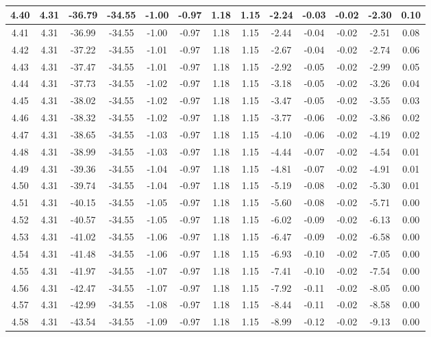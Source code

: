 \begin{table}[htbp]
\begin{adjustbox}{angle=90}
\begin{tabular}{|c|c|c|c|c|c|c|c|c|c|c|c|c|}
 4.40 & 4.31 & -36.79 & -34.55 & -1.00 & -0.97 & 1.18 & 1.15 & -2.24 & -0.03 & -0.02 & -2.30 & 0.10\\ \hline
 4.41 & 4.31 & -36.99 & -34.55 & -1.00 & -0.97 & 1.18 & 1.15 & -2.44 & -0.04 & -0.02 & -2.51 & 0.08\\ \hline
 4.42 & 4.31 & -37.22 & -34.55 & -1.01 & -0.97 & 1.18 & 1.15 & -2.67 & -0.04 & -0.02 & -2.74 & 0.06\\ \hline
 4.43 & 4.31 & -37.47 & -34.55 & -1.01 & -0.97 & 1.18 & 1.15 & -2.92 & -0.05 & -0.02 & -2.99 & 0.05\\ \hline
 4.44 & 4.31 & -37.73 & -34.55 & -1.02 & -0.97 & 1.18 & 1.15 & -3.18 & -0.05 & -0.02 & -3.26 & 0.04\\ \hline
 4.45 & 4.31 & -38.02 & -34.55 & -1.02 & -0.97 & 1.18 & 1.15 & -3.47 & -0.05 & -0.02 & -3.55 & 0.03\\ \hline
 4.46 & 4.31 & -38.32 & -34.55 & -1.02 & -0.97 & 1.18 & 1.15 & -3.77 & -0.06 & -0.02 & -3.86 & 0.02\\ \hline
 4.47 & 4.31 & -38.65 & -34.55 & -1.03 & -0.97 & 1.18 & 1.15 & -4.10 & -0.06 & -0.02 & -4.19 & 0.02\\ \hline
 4.48 & 4.31 & -38.99 & -34.55 & -1.03 & -0.97 & 1.18 & 1.15 & -4.44 & -0.07 & -0.02 & -4.54 & 0.01\\ \hline
 4.49 & 4.31 & -39.36 & -34.55 & -1.04 & -0.97 & 1.18 & 1.15 & -4.81 & -0.07 & -0.02 & -4.91 & 0.01\\ \hline
 4.50 & 4.31 & -39.74 & -34.55 & -1.04 & -0.97 & 1.18 & 1.15 & -5.19 & -0.08 & -0.02 & -5.30 & 0.01\\ \hline
 4.51 & 4.31 & -40.15 & -34.55 & -1.05 & -0.97 & 1.18 & 1.15 & -5.60 & -0.08 & -0.02 & -5.71 & 0.00\\ \hline
 4.52 & 4.31 & -40.57 & -34.55 & -1.05 & -0.97 & 1.18 & 1.15 & -6.02 & -0.09 & -0.02 & -6.13 & 0.00\\ \hline
 4.53 & 4.31 & -41.02 & -34.55 & -1.06 & -0.97 & 1.18 & 1.15 & -6.47 & -0.09 & -0.02 & -6.58 & 0.00\\ \hline
 4.54 & 4.31 & -41.48 & -34.55 & -1.06 & -0.97 & 1.18 & 1.15 & -6.93 & -0.10 & -0.02 & -7.05 & 0.00\\ \hline
 4.55 & 4.31 & -41.97 & -34.55 & -1.07 & -0.97 & 1.18 & 1.15 & -7.41 & -0.10 & -0.02 & -7.54 & 0.00\\ \hline
 4.56 & 4.31 & -42.47 & -34.55 & -1.07 & -0.97 & 1.18 & 1.15 & -7.92 & -0.11 & -0.02 & -8.05 & 0.00\\ \hline
 4.57 & 4.31 & -42.99 & -34.55 & -1.08 & -0.97 & 1.18 & 1.15 & -8.44 & -0.11 & -0.02 & -8.58 & 0.00\\ \hline
 4.58 & 4.31 & -43.54 & -34.55 & -1.09 & -0.97 & 1.18 & 1.15 & -8.99 & -0.12 & -0.02 & -9.13 & 0.00\\ \hline
            \end{tabular}
        \end{adjustbox}
        \caption{}
        \label{}
    \end{table}
    